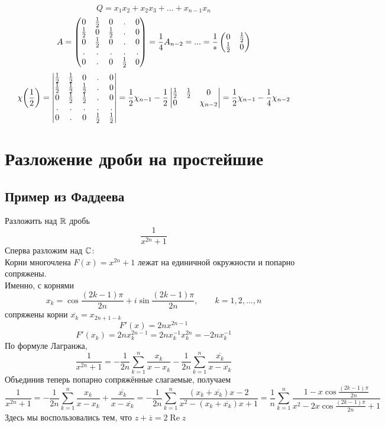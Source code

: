$$ Q = x_1x_2 + x_2x_3 + ... + x_{n - 1}x_n $$
$$ A =
\begin{pmatrix}
	0 & \frac{1}2 & 0 & . & 0 \\
    \frac{1}2 & 0 & \frac{1}2 & . & 0 \\
    0 & \frac{1}2 & 0 & . & 0 \\
    . & . & . & . & . \\
    0 & . & 0 & \frac{1}2 & 0
\end{pmatrix} = \frac14 A_{n - 2} = ... = \frac1*
\begin{pmatrix}
	0 & \frac{1}2 \\
    \frac{1}2 & 0
\end{pmatrix} $$
$$ \chi \bigg( \frac{1}2 \bigg) =
\begin{vmatrix}
	\frac{1}2 & \frac{1}2 & 0 & . & 0 \\
    \frac{1}2 & \frac{1}2 & \frac{1}2 & . & 0 \\
    0 & \frac{1}2 & \frac{1}2 & . & 0 \\
    . & . & . & . & . \\
    0 & . & 0 & \frac{1}2 & \frac{1}2
\end{vmatrix} = \frac12 \chi_{n - 1} - \frac{1}2
\begin{vmatrix}
	\frac{1}2 & \frac{1}2 & 0 \\
    0 & & \chi_{n -2}
\end{vmatrix} = \frac{1}2 \chi_{n - 1} - \frac14 \chi_{n - 2} $$

\chapter{Разложение дроби на простейшие}

\section{Пример из Фаддеева}

Разложить над $ \mathbb{R} $ дробь
$$ \frac1{x^{2n} + 1} $$
Сперва разложим над $ \mathbb{C} $: \\
Корни многочлена $ F(x) = x^{2n} + 1 $ лежат на единичной окружности и попарно сопряжены. \\
Именно, с корнями
$$ x_k = \cos \frac{(2k - 1)\pi}{2n} + i \sin \frac{(2k - 1)\pi}{2n}, \qquad k = 1, 2, ..., n $$
сопряжены корни $ \overline{x_k} = x_{2n + 1 - k} $
$$ F'(x) = 2nx^{2n - 1} $$
$$ F'(x_k) = 2nx_k^{2n - 1} = 2nx_k^{-1}x_k^{2n} = -2nx_k^{-1} $$
По формуле Лагранжа,
$$ \frac1{x^{2n} + 1} = -\frac1{2n} \sum_{k = 1}^n \frac{x_k}{x - x_k} - \frac1{2n} \sum_{k = 1}^n \frac{\overline{x_k}}{x - \overline{x_k}} $$
Объединив теперь попарно сопряжённые слагаемые, получаем
$$ \frac1{x^{2n} + 1} = -\frac1{2n} \sum_{k = 1}^n \frac{x_k}{x - x_k} + \frac{\overline{x_k}}{x - \overline{x_k}} = -\frac1{2n} \sum_{k = 1}^n \frac{(x_k + \overline{x_k})x - 2}{x^2 - (x_k + \overline{x_k})x + 1} = \frac1n \sum_{k = 1}^n \frac{1 - x\cos \frac{(2k - 1)\pi}{2n}}{x^2 - 2x\cos \frac{(2k - 1)\pi}{2n} + 1} $$
Здесь мы воспользовались тем, что $ z + \overline{z} = 2\operatorname{Re} z $

